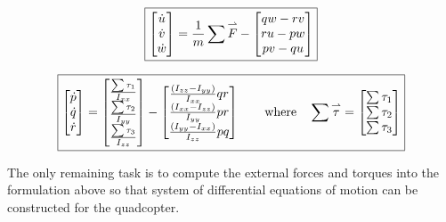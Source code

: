 $$\boxed{\begin{bmatrix} \dot{u} \\ \dot{v} \\ \dot{w} \end{bmatrix} = \frac{1}{m}\sum\overset{\rightharpoonup}{F} - \begin{bmatrix} q w - r v \\ r u -p w \\ p v - q u \end{bmatrix}} $$

$$\boxed{ \begin{bmatrix} \dot{p} \\ \dot{q} \\ \dot{r} \end{bmatrix} = \begin{bmatrix} \frac{\sum\tau_{1}}{I_{xx}} \\ \frac{\sum\tau_{2}}{I_{yy}} \\ \frac{\sum\tau_{3}}{I_{zz}} \end{bmatrix} - \begin{bmatrix} \frac{(I_{zz} - I_{yy})}{I_{xx}}qr \\ \frac{(I_{xx} - I_{zz})}{I_{yy}}pr \\ \frac{(I_{yy}- I_{xx})}{I_{zz}}pq \end{bmatrix} \quad \quad \text{where} \quad \sum\overset{\rightharpoonup}{\tau} = \begin{bmatrix} \sum\tau_{1} \\ \sum\tau_{2} \\ \sum\tau_{3} \end{bmatrix}}$$

The only remaining task is to compute the external forces and torques into the formulation above so that system of differential equations of motion can be constructed for the quadcopter. 